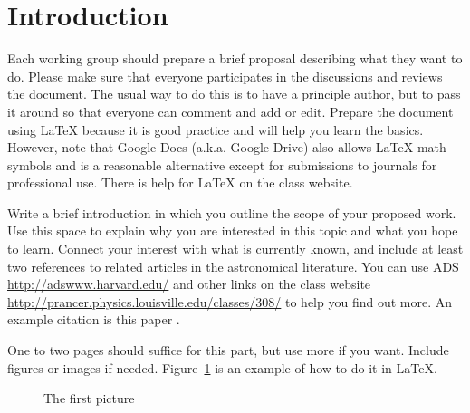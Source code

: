 \section{Introduction}


Each working group should prepare a brief proposal describing what they want 
to do.  Please make sure that everyone participates in the discussions and
reviews the document.  The usual way to do this is to have a principle author,
but to pass it around so that everyone can comment and add or edit.  Prepare the
document using \LaTeX\/ because it is good practice and will help you learn the
basics.  However, note that Google Docs (a.k.a. Google Drive) also allows
\LaTeX\/ math symbols and is a reasonable alternative except for submissions
to journals for professional use.  There is help for \LaTeX\/ on the
class website.

Write a brief introduction in which you  outline the scope of your proposed
work. Use this space to explain why you are interested in this topic and what
you hope to learn. Connect your interest with what is currently known, and
include at least two references to related articles in the astronomical
literature.  You can use ADS  \url{http://adswww.harvard.edu/} and other links
on the class website \url{http://prancer.physics.louisville.edu/classes/308/} 
to help you find out more. An example citation is this paper
\cite{gonzalez2012}.

One to two pages should suffice for this part, but use more if you want.  
Include figures or images if needed.  Figure~\ref{m42} is an example of  how to
do it in \LaTeX.


\begin{figure}
\begin{center}
\end{center}

\caption{The first picture\label{m42}}
\end{figure}


